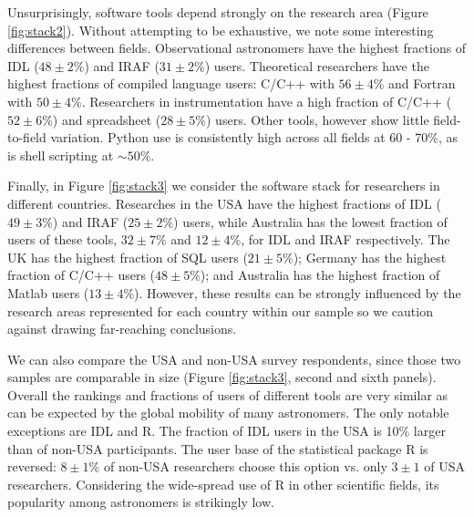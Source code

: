 Unsurprisingly, software tools depend strongly on the research area (Figure \ref{fig:stack2}). Without attempting to be exhaustive, we note some interesting differences between fields. Observational astronomers have the highest fractions of IDL ($48\pm2\%$) and IRAF ($31\pm2\%$) users. Theoretical researchers have the highest fractions of compiled language users: C/C++ with $56\pm4\%$ and Fortran with $50\pm4\%$. Researchers in instrumentation have a high fraction of C/C++ ($52\pm6\%$) and spreadsheet ($28\pm5\%$) users. Other tools, however show little field-to-field variation. Python use is consistently high across all fields at 60 - 70\%, as is shell scripting at $\sim50\%$. 

Finally, in Figure \ref{fig:stack3} we consider the software stack for researchers in different countries. Researches in the USA have the highest fractions of IDL ($49\pm3\%$) and IRAF ($25\pm2\%$) users, while Australia has the lowest fraction of users of these tools, $32\pm7\%$ and $12\pm4\%$, for IDL and IRAF respectively. The UK has the highest fraction of SQL users ($21\pm5\%$); Germany has the highest fraction of C/C++ users ($48\pm5\%$); and Australia has the highest fraction of Matlab users ($13\pm4\%$). However, these results can be strongly influenced by the research areas represented for each country within our sample so we caution against drawing far-reaching conclusions. 

We can also compare the USA and non-USA survey respondents, since those two samples are comparable in size (Figure \ref{fig:stack3}, second and sixth panels). Overall the rankings and fractions of users of different tools are very similar as can be expected by the global mobility of many astronomers. The only notable exceptions are IDL and R. The fraction of IDL users in the USA is 10\% larger than of non-USA participants. The user base of the statistical package R is reversed:  $8\pm1\%$ of non-USA researchers choose this option vs. only $3\pm1$ of USA researchers. Considering the wide-spread use of R in other scientific fields, its popularity among astronomers is strikingly low.
    
  
  
